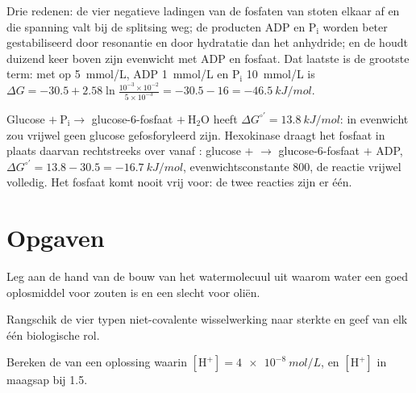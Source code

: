 \begin{example}\label{ex:b1:water-small-molecules:whyatp}
Drie redenen: de vier negatieve ladingen van de fosfaten van  stoten elkaar af
en die spanning valt bij de splitsing weg; de producten $\mathrm{ADP}$ en
$\mathrm{P_i}$ worden beter gestabiliseerd door resonantie en door hydratatie dan
het anhydride; en de  houdt  duizend keer boven zijn evenwicht met ADP en
fosfaat. Dat laatste is de grootste term: met  op \qty{5}{mmol/L}, ADP
\qty{1}{mmol/L} en $\mathrm{P_i}$ \qty{10}{mmol/L} is
$\Delta G = -30.5 + 2.58\ln\frac{10^{-3}\times 10^{-2}}{5\times 10^{-3}}
= -30.5 - 16 = \qty{-46.5}{kJ/mol}$.
\end{example}

\begin{example}[Koppeling]\label{ex:b1:water-small-molecules:coupling}
Glucose $+\ \mathrm{P_i} \to$ glucose-6-fosfaat $+\ \mathrm{H_2O}$ heeft
$\Delta G^{\circ\prime} = \qty{+13.8}{kJ/mol}$: in evenwicht zou vrijwel geen
glucose gefosforyleerd zijn. Hexokinase draagt het fosfaat in plaats daarvan
rechtstreeks over vanaf : glucose $+$  $\to$ glucose-6-fosfaat $+$ ADP,
$\Delta G^{\circ\prime} = 13.8 - 30.5 =
\qty{-16.7}{kJ/mol}$, evenwichtsconstante $800$, de reactie vrijwel volledig. Het
fosfaat komt nooit vrij voor: de twee reacties zijn er één.
\end{example}

\section{Opgaven}

\begin{exercise}[$\star$]\label{exo:b1:water-small-molecules:1}
Leg aan de hand van de bouw van het watermolecuul uit waarom water een goed
oplosmiddel voor zouten is en een slecht voor oliën.
\end{exercise}

\begin{exercise}[$\star$]\label{exo:b1:water-small-molecules:2}
Rangschik de vier typen niet-covalente wisselwerking naar sterkte en geef van
elk één biologische rol.
\end{exercise}

\begin{exercise}[$\star$]\label{exo:b1:water-small-molecules:3}
Bereken de  van een oplossing waarin $[\mathrm{H^+}] = \qty{4e-8}{mol/L}$, en
$[\mathrm{H^+}]$ in maagsap bij  1.5.
\end{exercise}

